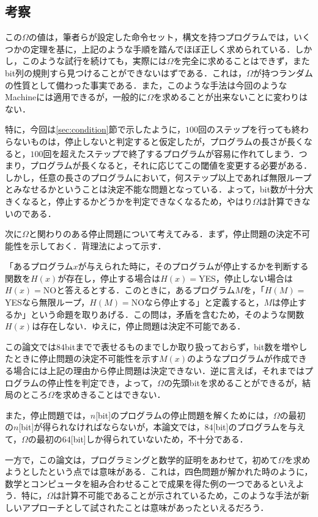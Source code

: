 \documentclass{jarticle}
\begin{document}
\subsection{考察}
この$\Omega$の値は，筆者らが設定した命令セット，構文を持つプログラムでは，いくつかの定理を基に，上記のような手順を踏んでほぼ正しく求められている．しかし，このような試行を続けても，実際には$\Omega$を完全に求めることはできず，またbit列の規則すら見つけることができないはずである．これは，$\Omega$が持つランダムの性質として備わった事実である．また，このような手法は今回のようなMachineには適用できるが，一般的に$\Omega$を求めることが出来ないことに変わりはない．

特に，今回は\ref{sec:condition}節で示したように，$100$回のステップを行っても終わらないものは，停止しないと判定すると仮定したが，プログラムの長さが長くなると，$100$回を超えたステップで終了するプログラムが容易に作れてしまう．つまり，プログラムが長くなると，それに応じてこの閾値を変更する必要がある．しかし，任意の長さのプログラムにおいて，何ステップ以上であれば無限ループとみなせるかということは決定不能な問題となっている．よって，bit数が十分大きくなると，停止するかどうかを判定できなくなるため，やはり$\Omega$は計算できないのである．

次に$\Omega$と関わりのある停止問題について考えてみる．まず，停止問題の決定不可能性を示しておく．背理法によって示す．

「あるプログラム$x$が与えられた時に，そのプログラムが停止するかを判断する関数を$H(x)$が存在し，停止する場合は$H(x)=$YES，停止しない場合は$H(x)=$NOと答えるとする．このときに，あるプログラム$M$を，「$H(M)=$YESなら無限ループ，$H(M)=$NOなら停止する」と定義すると，$M$は停止するか」という命題を取りあげる．この問は，矛盾を含むため，そのような関数$H(x)$は存在しない．ゆえに，停止問題は決定不可能である．

この論文では$84$bitまでで表せるものまでしか取り扱っておらず，bit数を増やしたときに停止問題の決定不可能性を示す$M(x)$のようなプログラムが作成できる場合には上記の理由から停止問題は決定できない．逆に言えば，それまではプログラムの停止性を判定でき，よって，$\Omega$の先頭bitを求めることができるが，結局のところ$\Omega$を求めきることはできない．

また，停止問題では，$n$[bit]のプログラムの停止問題を解くためには，$\Omega$の最初の$n$[bit]が得られなければならないが，本論文では，$84$[bit]のプログラムを与えて，$\Omega$の最初の$64$[bit]しか得られていないため，不十分である．


一方で，この論文は，プログラミングと数学的証明をあわせて，初めて$\Omega$を求めようとしたという点では意味がある．これは，四色問題が解かれた時のように，数学とコンピュータを組み合わせることで成果を得た例の一つであるといえよう．特に，$\Omega$は計算不可能であることが示されているため，このような手法が新しいアプローチとして試されたことは意味があったといえるだろう．
\end{document}
